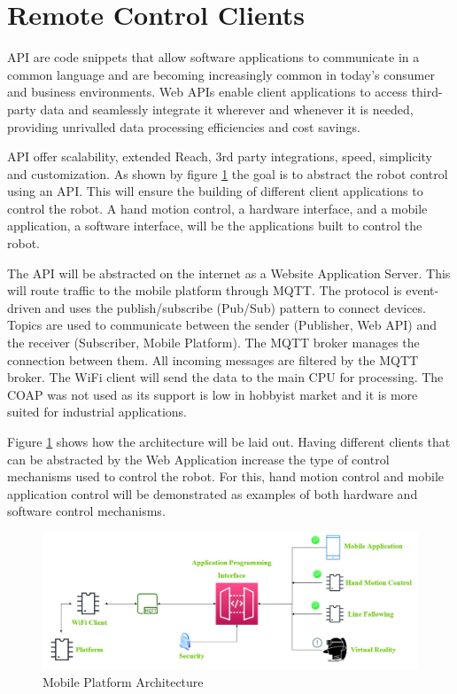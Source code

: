 \section{Remote Control Clients}

\ac{API} are code snippets that allow software applications to communicate in a common language and are becoming increasingly common in today's consumer and business environments. Web APIs enable client applications to access third-party data and seamlessly integrate it wherever and whenever it is needed, providing unrivalled data processing efficiencies and cost savings.

\ac{API} offer scalability, extended Reach, 3rd party integrations, speed, simplicity and customization. As shown by figure \ref{fig:omicronplatformcontrol} the goal is to abstract the robot control using an \ac{API}. This will ensure the building of different client applications to control the robot. A hand motion control, a hardware interface, and a mobile application, a software interface, will be the applications built to control the robot.

The \ac{API} will be abstracted on the internet as a Website Application Server. This will route traffic to the mobile platform through \ac{MQTT}. The protocol is event-driven and uses the publish/subscribe (Pub/Sub) pattern to connect devices. Topics are used to communicate between the sender (Publisher, Web \ac{API}) and the receiver (Subscriber, Mobile Platform). The \ac{MQTT} broker manages the connection between them. All incoming messages are filtered by the \ac{MQTT} broker. The WiFi client will send the data to the main CPU for processing. The \ac{COAP} was not used as its support is low in hobbyist market and it is more suited for industrial applications.

Figure \ref{fig:omicronplatformcontrol} shows how the architecture will be laid out. Having different clients that can be abstracted by the Web Application increase the type of control mechanisms used to control the robot. For this, hand motion control and mobile application control will be demonstrated as examples of both hardware and software control mechanisms.

\begin{figure}[H]
    \centering
    \includegraphics[scale=0.3]{Figures/omriconrobotPlatformControl.jpg}
    \caption{Mobile Platform Architecture}
    \label{fig:omicronplatformcontrol}
\end{figure}

